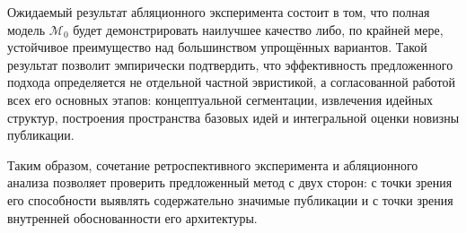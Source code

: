 \documentclass[review,3p,times]{elsarticle}
\begin{document}
Ожидаемый результат абляционного эксперимента состоит в том, что полная модель $\mathcal{M}_0$ будет демонстрировать наилучшее качество либо, по крайней мере, устойчивое преимущество над большинством упрощённых вариантов. Такой результат позволит эмпирически подтвердить, что эффективность предложенного подхода определяется не отдельной частной эвристикой, а согласованной работой всех его основных этапов: концептуальной сегментации, извлечения идейных структур, построения пространства базовых идей и интегральной оценки новизны публикации.

Таким образом, сочетание ретроспективного эксперимента и абляционного анализа позволяет проверить предложенный метод с двух сторон: с точки зрения его способности выявлять содержательно значимые публикации и с точки зрения внутренней обоснованности его архитектуры.









\end{document}
